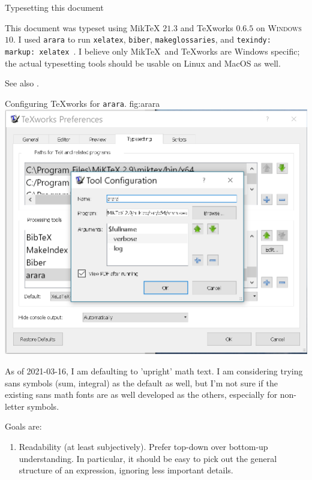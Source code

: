 \begin{plSection}{Typesetting this document}

This document was typeset using Mik\TeX{} $21.3$ \cite{Schenk:2017:Miktex} 
and {\TeX}works $0.6.5$ \cite{KewLoffler:2017:Texworks} 
on \textsc{Windows} $10$. 
I used \texttt{arara} \cite{CeredaEtAl:2021:Arara} 
to run \texttt{xelatex}, \texttt{biber}, \texttt{makeglossaries},  and
\texttt{texindy: { markup: xelatex }}.
I believe only Mik\TeX\  and {\TeX}works are Windows specific; 
the actual typesetting tools should be usable on Linux and MacOS as well.

See also \cite{Talbot:2012:LatexNovices,Talbot:2013:LatexPhD}.

\begin{plScreen}
{Configuring {\TeX}works for \texttt{arara}.}
{fig:arara}
\centering
\includegraphics[scale=0.75]{arara.png}
\end{plScreen}

As of 2021-03-16, I am defaulting to 'upright' math text.
I am considering trying sans symbols (sum, integral) 
as the default as well,
but I'm not sure if the existing sans math fonts are as well
developed as the others, especially for non-letter symbols.

Goals are:
\begin{enumerate}
\item Readability (at least subjectively). Prefer top-down over
    bottom-up understanding. In particular, it should be easy to
    pick out the general structure of an expression, ignoring
    less important details.


\end{enumerate}
\end{plSection}
